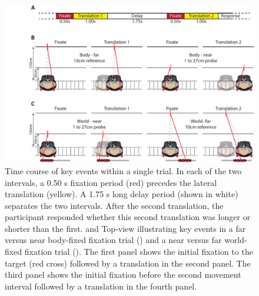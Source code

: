 
\begin{figure}
    \includegraphics[width=1.0\textwidth]{src/paper4/p4_figure1.pdf}

    \caption{ Time course  of key events within a single trial. In each of the two intervals, a 0.50 \si{\second} fixation period (red) precedes the lateral translation (yellow). A 1.75 \si{\second} long delay period (shown in white) separates the two intervals. After the second translation, the participant responded whether this second translation was longer or shorter than the first.  and  Top-view illustrating key events in a far versus near body-fixed fixation trial () and a near versus far world-fixed fixation trial (). The first panel shows the initial fixation to the target (red cross) followed by a translation in the second panel. The third panel shows the initial fixation before the second movement interval followed by a translation in the fourth panel.}
    \label{p4:fig1}
\end{figure}

